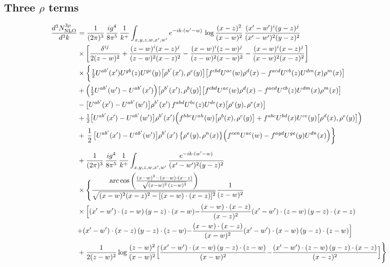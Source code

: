 \documentclass[9pt]{article}
\numberwithin{equation}{section}
\begin{document}
\subsection{Three $\rho$ terms}
\begin{align}
    \frac{d^{3}N^{3\rho}_{\rm NLO}}{d^{3}k}&=\frac{1}{(2\pi)^{3}}\,\frac{ig^{4}}{8\pi^{5}}\,\frac{1}{k^{+}}\int_{x,y,z,w,x',w'}e^{-ik\cdot(w'-w)}\,\log\frac{(x-z)^{2}}{(x-w)^{2}}\,\frac{(x'-w')^{i}(y-z)^{j}}{(x'-w')^{2}(y-z)^{2}}\notag\\
&\times\bigg[\frac{\delta^{ij}}{2(z-w)^{2}}+\frac{(z-w)^{i}(x-z)^{j}}{(z-w)^{2}(x-z)^{2}}-\frac{(x-w)^{i}(z-w)^{j}}{(z-w)^{2}(x-w)^{2}}-\frac{(x-w)^{i}(x-z)^{j}}{(x-w)^{2}(x-z)^{2}}\bigg]\notag\\
&\times\bigg\{\tfrac12U^{ab'}(x')U^{gb}(z)U^{ge}(y)\big[\rho^{b'}(x'),\rho^{e}(y)\big]\big[f^{cbd}U^{ac}(w)\rho^{d}(x)-f^{acd}U^{cb}(z)U^{dm}(x)\rho^{m}(x)\big]\notag\\
&+\Big(\tfrac12U^{ab'}(w')-U^{ab'}(x')\Big)\big[\rho^{b'}(x'),\rho^{b}(y)\big]\big[f^{cbd}U^{ac}(w)\rho^{d}(x)-f^{acd}U^{cb}(z)U^{dm}(x)\rho^{m}(x)\big]\notag\\
&-\big[U^{ab'}(x')-U^{ab'}(w')\big]\rho^{b'}(x')\,f^{abd}U^{bc}(z)U^{de}(x)\big[\rho^{c}(y),\rho^{e}(x)\big]\notag\\
&+\tfrac12\big[U^{ab'}(x')-U^{ab'}(w')\big]\rho^{b'}(x')\Big(f^{hbc}U^{ah}(w)\big[\rho^{b}(x),\rho^{c}(y)\big]+f^{abc}U^{bd}(x)U^{ce}(y)\big[\rho^{d}(x),\rho^{e}(y)\big]\Big)\notag\\
&+\,\frac{1}{2}\,\big[U^{ab'}(x')-U^{ab'}(w')\big]\rho^{b'}(x')\,\big\{\rho^{e}(y),\rho^{n}(x)\big\}\Big(f^{cen}U^{ac}(w)-f^{agd}U^{ge}(y)U^{dn}(x)\Big)\bigg\}\notag\\[6pt]
&+\frac{1}{(2\pi)^{3}}\,\frac{ig^{4}}{8\pi^{5}}\,\frac{1}{k^{+}}\int_{x,y,z,w,x',w'}\frac{e^{-ik\cdot(w'-w)}}{(x'-w')^{2}(y-z)^{2}}\notag\\
&\times\Bigg\{\frac{\mathrm{arc\,cos}\left(\frac{(x-w)^{2}-(x-w)\cdot (x-z)}{\sqrt{(x-w)^{2}\,(z-w)^{2}}}\right)}{\sqrt{(x-w)^{2}(x-z)^{2}-[(x-w)\cdot(x-z)]^{2}}}\frac{1}{(z-w)^{2}}\notag\\
&\times\Big[{(x'-w')\cdot(z-w)\,(y-z)\cdot(x-w)}{-\frac{(x-w)\cdot(x-z)}{(x-z)^{2}}(x'-w')\cdot(z-w)\,(y-z)\cdot(x-z)}\notag\\
&{+(x'-w')\cdot(x-z)\,(y-z)\cdot(z-w)}{-\frac{(x-w)\cdot(x-z)}{(x-w)^{2}}(x'-w')\cdot(x-w)\,(y-z)\cdot(z-w)}\Big]\notag\\
&+\frac{1}{2(z-w)^{2}}\log\frac{(z-w)^{2}}{(x-w)^{2}}\Big[{\frac{(x'-w')\cdot(x-w)\,(y-z)\cdot(z-w)}{(x-w)^{2}}}{-\frac{(x'-w')\cdot(z-w)\,(y-z)\cdot(x-z)}{(x-z)^{2}}}\Big]\Bigg\}\notag\\

\end{align}
\end{document}
